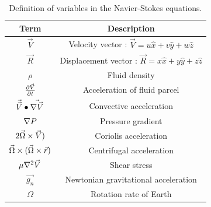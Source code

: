 \begin{table}[H]
	\centering
		\caption[Navier-Stokes equation variables]{Definition of variables in the Navier-Stokes equations.} \vspace{6pt}
	\label{table:nse_vars}
	\begin{tabular}{c c}
	\hline  \hline
	\textbf{Term} 				        & \textbf{Description}      							      		    \\ [1ex]  \hline  
	$\vec{V}$		                                    & Velocity vector : $\vec{V}=u\hat{x} + v\hat{y} + w\hat{z}$                        \\ 
	$\vec{R}$					        & Displacement vector : $\vec{R} = x\hat{x} + y\hat{y} + z\hat{z}$            \\ 
	$\rho $                    		                 &  Fluid density   		 								    \\ 
	$\frac{\partial \vec{V}}{\partial t}$    		                 & Acceleration of fluid parcel  						   		    \\ 
	$\vec{\vec{V}} \bullet \vec{\nabla \vec{V}}$       &  Convective acceleration                 				      		             \\ 
	$\nabla P  $                                       & Pressure gradient          					                       		    \\ 
	$2\vec{\Omega} \times \vec{V})$                                 &  Coriolis acceleration            			   		            		    \\ 
	$\vec{\Omega} \times (\vec{\Omega} \times \vec{r})$                          &  Centrifugal acceleration   		  				   		    \\ 
	$\mu \nabla^2 \vec{V}$   	 	        &  Shear stress    				        			             		    \\ 
	$\vec{g_n}$       			        & Newtonian gravitational acceleration   						    \\ 
	$\Omega$       				        & Rotation rate of Earth					    		                       \\ [1ex] 
	\hline
	\end{tabular}		
\end{table}

